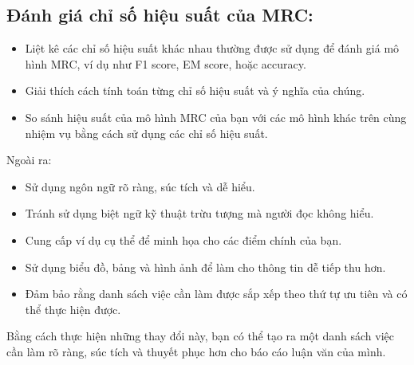 \subsection{Đánh giá chỉ số hiệu suất của MRC:}\label{subsec:5.-anh-gia-chi-so-hieu-suat-cua-mrc:}
\begin{itemize}
    \item Liệt kê các chỉ số hiệu suất khác nhau thường được sử dụng để đánh giá mô hình MRC, ví dụ như F1 score, EM score, hoặc accuracy.
    \item Giải thích cách tính toán từng chỉ số hiệu suất và ý nghĩa của chúng.
    \item So sánh hiệu suất của mô hình MRC của bạn với các mô hình khác trên cùng nhiệm vụ bằng cách sử dụng các chỉ số hiệu suất.
\end{itemize}
Ngoài ra:
\begin{itemize}
    \item Sử dụng ngôn ngữ rõ ràng, súc tích và dễ hiểu.
    \item Tránh sử dụng biệt ngữ kỹ thuật trừu tượng mà người đọc không hiểu.
    \item Cung cấp ví dụ cụ thể để minh họa cho các điểm chính của bạn.
    \item Sử dụng biểu đồ, bảng và hình ảnh để làm cho thông tin dễ tiếp thu hơn.
    \item Đảm bảo rằng danh sách việc cần làm được sắp xếp theo thứ tự ưu tiên và có thể thực hiện được.
\end{itemize}
Bằng cách thực hiện những thay đổi này, bạn có thể tạo ra một danh sách việc cần làm rõ ràng, súc tích và thuyết phục hơn cho báo cáo luận văn của mình.


